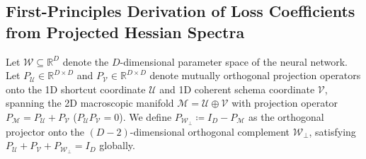 \documentclass{article}
\theoremstyle{plain}
\theoremstyle{definition}
\begin{document}
\subsection{First-Principles Derivation of Loss Coefficients from Projected Hessian Spectra}
\label{sec:app_hessian_derivation}
Let $\mathcal{W} \subseteq \mathbb{R}^D$ denote the $D$-dimensional parameter space of the neural network. Let $P_{\mathcal{U}} \in \mathbb{R}^{D \times D}$ and $P_{\mathcal{V}} \in \mathbb{R}^{D \times D}$ denote mutually orthogonal projection operators onto the 1D shortcut coordinate $\mathcal{U}$ and 1D coherent schema coordinate $\mathcal{V}$, spanning the 2D macroscopic manifold $\mathcal{M} = \mathcal{U} \oplus \mathcal{V}$ with projection operator $P_{\mathcal{M}} = P_{\mathcal{U}} + P_{\mathcal{V}}$ ($P_{\mathcal{U}} P_{\mathcal{V}} = 0$). We define $P_{\mathcal{W}_\perp} \coloneqq I_D - P_{\mathcal{M}}$ as the orthogonal projector onto the $(D-2)$-dimensional orthogonal complement $\mathcal{W}_\perp$, satisfying $P_{\mathcal{U}} + P_{\mathcal{V}} + P_{\mathcal{W}_\perp} = I_D$ globally.
\end{document}
